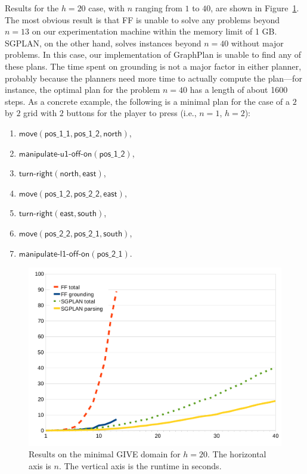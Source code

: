 Results for the $h=20$ case, with $n$ ranging from $1$ to $40$, are shown
in Figure~\ref{fig:give-runtime-minimal}. The most obvious result is that
FF is unable to solve any problems beyond $n=13$ on our experimentation
machine within the memory limit of 1 GB. SGPLAN, on the other hand, solves
instances beyond $n=40$ without major problems. In this case, our
implementation of GraphPlan is unable to find any of these plans. The time
spent on grounding is not a major factor in either planner, probably
because the planners need more time to actually compute the plan---for
instance, the optimal plan for the problem $n=40$ has a length of about
1600 steps. As a concrete example, the following is a minimal plan for the
case of a $2$ by $2$ grid with $2$ buttons for the player to press (i.e.,
$n=1$, $h=2$):

\begin{enumerate}
\item $\mathsf{move}(\mathsf{pos\_1\_1},\mathsf{pos\_1\_2}, \mathsf{north})$,
\item $\mathsf{manipulate}\textsf{-}\mathsf{u1}\textsf{-}\mathsf{off}\textsf{-}\mathsf{on}(\mathsf{pos\_1\_2})$,
\item $\mathsf{turn}\textsf{-}\mathsf{right}(\mathsf{north}, \mathsf{east})$,
\item $\mathsf{move}(\mathsf{pos\_1\_2}, \mathsf{pos\_2\_2},
  \mathsf{east})$,
\item $\mathsf{turn}\textsf{-}\mathsf{right}(\mathsf{east}, \mathsf{south})$,
\item $\mathsf{move}(\mathsf{pos\_2\_2}, \mathsf{pos\_2\_1}, \mathsf{south})$,
\item $\mathsf{manipulate}\textsf{-}\mathsf{l1}\textsf{-}\mathsf{off}\textsf{-}\mathsf{on}(\mathsf{pos\_2\_1})$.
\end{enumerate}


\begin{figure}[t]
  \centering
  \includegraphics[width=0.75\columnwidth]{graph-exp2}
  \caption{Results on the minimal GIVE
    domain for $h=20$. The horizontal axis is $n$. The vertical axis
    is the runtime in seconds.}
  \label{fig:give-runtime-minimal}
\end{figure}



